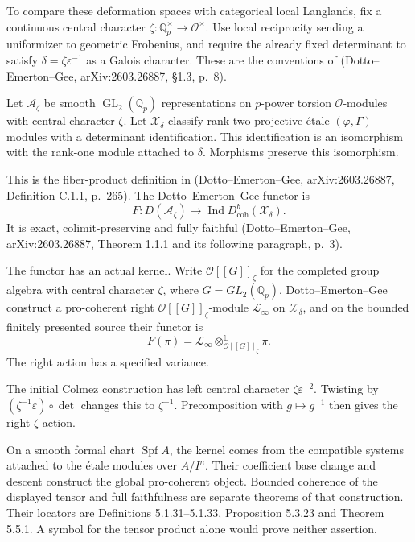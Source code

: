 To compare these deformation spaces with categorical local Langlands,
fix a continuous central character
$\zeta:\mathbb Q_p^\times\to\mathcal O^\times$.
Use local reciprocity sending a uniformizer to geometric Frobenius,
and require the already fixed determinant to satisfy
$\delta=\zeta\varepsilon^{-1}$ as a Galois character.
These are the conventions of (Dotto--Emerton--Gee, arXiv:2603.26887, \S1.3, p.~8).

Let $\mathcal A_\zeta$ be smooth $\operatorname{GL}_2(\mathbb Q_p)$
representations on $p$-power torsion $\mathcal O$-modules with
central character $\zeta$. Let $\mathcal X_\delta$ classify rank-two projective \'etale
$(\varphi,\Gamma)$-modules with a determinant identification.
This identification is an isomorphism with the rank-one module
attached to $\delta$. Morphisms preserve this isomorphism.

This is the fiber-product definition in
(Dotto--Emerton--Gee, arXiv:2603.26887, Definition C.1.1, p.~265).
The Dotto--Emerton--Gee functor is
\[
 F:D(\mathcal A_\zeta)\longrightarrow
          \operatorname{Ind}D^b_{\mathrm{coh}}(\mathcal X_\delta).
\]
It is exact, colimit-preserving and fully faithful
(Dotto--Emerton--Gee, arXiv:2603.26887, Theorem 1.1.1 and its following paragraph, p.~3).

The functor has an actual kernel. Write
\(\mathcal O[[G]]_\zeta\) for the completed group algebra with
central character \(\zeta\), where \(G=GL_2(\mathbb Q_p)\).
Dotto--Emerton--Gee construct a pro-coherent right
\(\mathcal O[[G]]_\zeta\)-module \(\mathcal L_\infty\) on
\(\mathcal X_\delta\), and on the bounded finitely presented source
their functor is
\[
 F(\pi)=\mathcal L_\infty
              \otimes_{\mathcal O[[G]]_\zeta}^{\mathbb L}\pi.
\]
The right action has a specified variance.

The initial Colmez
construction has left central character
\(\zeta\varepsilon^{-2}\). Twisting by
\((\zeta^{-1}\varepsilon)\circ\det\) changes this to
\(\zeta^{-1}\). Precomposition with \(g\mapsto g^{-1}\)
then gives the right \(\zeta\)-action.

On a smooth formal chart \(\operatorname{Spf}A\), the kernel comes
from the compatible systems attached to the étale modules over
\(A/I^n\). Their coefficient base change and descent construct the
global pro-coherent object. Bounded coherence of the displayed tensor and full faithfulness
are separate theorems of that construction.
Their locators are Definitions 5.1.31--5.1.33,
Proposition 5.3.23 and Theorem 5.5.1.
A symbol for the tensor product alone would prove neither assertion.


